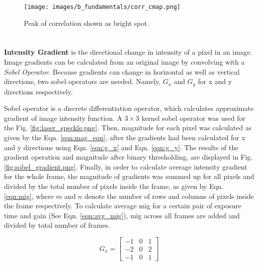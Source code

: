     \begin{figure}[h]
        \hspace{40pt}
        \texttt{[image: images/b\_fundamentals/corr\_cmap.png]}
        \caption{Peak of correlation shown as bright spot.}
        \label{fig:corr_cmap.png}
    \end{figure}

    

    \section*{}\label{section:mig}
    \textbf{Intensity Gradient} is the directional change in intensity of a pixel in an image. Image gradients can be calculated from an original image by convolving with a \emph{Sobel Operator}. Because gradients can change in horizontal as well as vertical directions, two sobel operators are needed. Namely, $G_x$ and $G_y$ for x and y directions respectively.
    
    \vspace{5mm}
    \noindent Sobel operator is a discrete differentiation operator, which calculates approximate gradient of image intensity function. A $3\times3$ kernel sobel operator was used for the Fig. \ref{fig:laser_speckle.png}. Then, magnitude for each pixel was calculated as given by the Eqn. \ref{eqn:mag_eqn}, after the gradients had been calculated for x and y directions using Eqn. \ref{eqn:g_x} and Eqn. \ref{eqn:g_y}. The results of the gradient operation and magnitude after binary thresholding, are displayed in Fig. \ref{fig:sobel_gradient.png}. Finally, in order to calculate average intensity gradient for the whole frame, the magnitude of gradients was summed up for all pixels and divided by the total number of pixels inside the frame, as given by Eqn. \ref{eqn:mig}, where $m$ and $n$ denote the number of rows and columns of pixels inside the frame respectively. To calculate average \gls{mig} for a certain pair of exposure time and gain (See Eqn. \ref{eqn:avg_mig}), \gls{mig} across all frames are added and divided by total number of frames. 
    
    \begin{equation}
        G_x = 
        \begin{bmatrix}
            -1 & 0 & 1 \\
            -2 & 0 & 2 \\
            -1 & 0 & 1 
        \end{bmatrix}
        \label{eqn:g_x}
    \end{equation}

